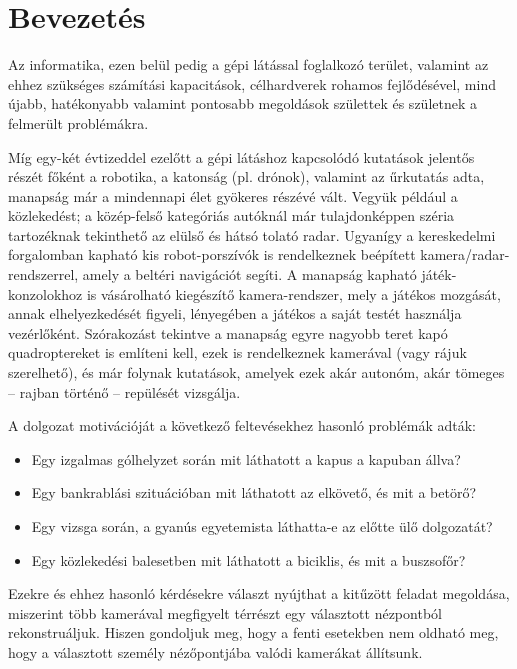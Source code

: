 \chapter*{Bevezetés}

Az informatika, ezen belül pedig a gépi látással foglalkozó terület, valamint az ehhez szükséges számítási kapacitások, célhardverek rohamos fejlődésével, mind újabb, hatékonyabb valamint pontosabb megoldások születtek és születnek a felmerült problémákra.

Míg egy-két évtizeddel ezelőtt a gépi látáshoz kapcsolódó kutatások jelentős részét főként a robotika, a katonság (pl. drónok), valamint az űrkutatás adta, manapság már a mindennapi élet gyökeres részévé vált. Vegyük például a közlekedést; a közép-felső kategóriás autóknál már tulajdonképpen széria tartozéknak tekinthető az elülső és hátsó tolató radar. Ugyanígy a kereskedelmi forgalomban kapható kis robot-porszívók is rendelkeznek beépített kamera/radar-rendszerrel, amely a beltéri navigációt segíti. A manapság kapható játék-konzolokhoz is vásárolható kiegészítő kamera-rendszer, mely a játékos mozgását, annak elhelyezkedését figyeli, lényegében a játékos a saját testét használja vezérlőként. Szórakozást tekintve a manapság egyre nagyobb teret kapó quadroptereket \cite{quadropter} is említeni kell, ezek is rendelkeznek kamerával (vagy rájuk szerelhető), és már folynak kutatások, amelyek ezek akár autonóm, akár tömeges -- rajban történő -- repülését vizsgálja.

A dolgozat motivációját a következő feltevésekhez hasonló problémák adták:
\begin{itemize}
\item Egy izgalmas gólhelyzet során mit láthatott a kapus a kapuban állva?
\item Egy bankrablási szituációban mit láthatott az elkövető, és mit a betörő?
\item Egy vizsga során, a gyanús egyetemista láthatta-e az előtte ülő dolgozatát?
\item Egy közlekedési balesetben mit láthatott a biciklis, és mit a buszsofőr?
\end{itemize}

Ezekre és ehhez hasonló kérdésekre választ nyújthat a kitűzött feladat megoldása, miszerint több kamerával megfigyelt térrészt egy választott nézpontból rekonstruáljuk. Hiszen gondoljuk meg, hogy a fenti esetekben nem oldható meg, hogy a választott személy nézőpontjába valódi kamerákat állítsunk.

